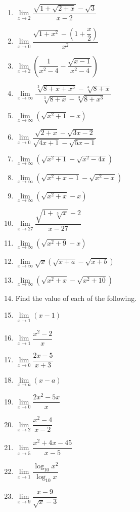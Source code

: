 \documentclass{report}
\begin{document}
\begin{multicols}{2}
\begin{enumerate}
            \item $\lim\limits_{x\to2}\dfrac{\sqrt{1+\sqrt{2+x}}-\sqrt{3}}{x-2}$
            \item $\lim\limits_{x\to0}\dfrac{\sqrt{1+x^2}-\left(1+\dfrac{x}{2}\right)}{x^2}$
            \item $\lim\limits_{x\rightarrow2}\left(\dfrac{1}{x^{2}-4}-\dfrac{\sqrt{x-1}}{x^{2}-4}\right)$
            \item $\lim\limits_{x\rightarrow\infty}\dfrac{\sqrt[3]{8+x+x^{3}}-\sqrt[3]{8+x}}{\sqrt[3]{8+x}-\sqrt[3]{8+x^{3}}}$
            \item $\lim\limits_{x\to\infty}({\sqrt{x^{2}+1}}-x)$
            \item $\lim\limits_{x\to0}\dfrac{\sqrt{2+x}-\sqrt{3x-2}}{\sqrt{4x+1}-\sqrt{5x-1}}$
            \item $\lim\limits_{x\to\infty}(\sqrt{x^2+1}-\sqrt{x^2-4x})$
            \item $\lim\limits_{x\to\infty}(\sqrt{x^2+x-1}-\sqrt{x^2-x})$
            \item $\lim\limits_{x\to\infty}(\sqrt{x^2+x}-x)$
            \item $\lim\limits_{x\rightarrow27}{\dfrac{\sqrt{1+\sqrt[3]{x}}-2}{x-27}}$
            \item $\lim\limits_{x\to\infty}(\sqrt{x^2+9}-x)$
            \item $\lim\limits_{x\to\infty}\sqrt{x}(\sqrt{x+a}-\sqrt{x+b})$
            \item $\lim\limits_{x\to\infty}(\sqrt{x^2+x}-\sqrt{x^2+10})$
            \item Find the value of each of the following.
            \item $\lim\limits_{x\to1}(x-1)$
            \item $\lim\limits_{x\to1}{\dfrac{x^{2}-2}{x}}$
            \item $\lim\limits_{x\to0}{\dfrac{2x-5}{x+3}}$
            \item $\lim\limits_{x\rightarrow a}(x-a)$
            \item $\lim\limits_{x\to0}{\dfrac{2x^{2}-5x}{x}}$
            \item $\lim\limits_{x\to2}{\dfrac{x^{2}-4}{x-2}}$
            \item $\lim\limits_{x\to5}{\dfrac{x^{2}+4x-45}{x-5}}$
            \item $\lim\limits_{x\to1}{\dfrac{\log_{\mathrm{10}}x^{2}}{\log_{\mathrm{10}}x}}$
            \item $\lim\limits_{x\to9}{\dfrac{x-9}{\sqrt{x}-3}}$

\end{enumerate}
\end{multicols}
\end{document}
